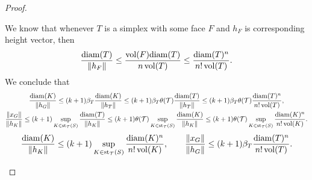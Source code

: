 \documentclass[10pt,letterpaper]{article}
\begin{document}
\begin{proof}
\begin{itemize}
        We know that whenever $T$ is a simplex with some face $F$ and $h_F$ is corresponding height vector, then 
        \begin{align*}
            \frac{{\operatorname{diam}}(T)}{ \|h_{F}\|}
            \leq  
            \frac{ \operatorname{vol}(F) {\operatorname{diam}}(T) }{ n \operatorname{vol}(T) }
            \leq 
            \frac{ {\operatorname{diam}}(T)^{n} }{ n! \operatorname{vol}(T) }
            .
        \end{align*}
        We conclude that 
        \begin{gather*}
            \frac{ {\operatorname{diam}}(K) }{ \| h_{{G}} \| }
            \leq 
            (k+1)\beta_T
            \frac{ {\operatorname{diam}}(K) }{ \| h_{T} \| }
            \leq 
            (k+1)\beta_T
            \theta({\mathcal T})
            \frac{ {\operatorname{diam}}(T) }{ \| h_{T} \| }
            \leq 
            (k+1)\beta_T
            \theta({\mathcal T})
            \frac{ {\operatorname{diam}}(T)^{n} }{ n! \operatorname{vol}(T) }
            ,
            \\
            \frac{ \| x_{G} \| }{ \| h_{K} \| }
            \leq 
            (k+1)
            \sup_{ K \in \operatorname{st}_{{\mathcal T}}(S) }
            \frac{ {\operatorname{diam}}(T) }{ \| h_{K} \| }
            \leq 
            (k+1)
            \theta({\mathcal T})
            \sup_{ K \in \operatorname{st}_{{\mathcal T}}(S) }
            \frac{ {\operatorname{diam}}(K) }{ \| h_{K} \| }
            \leq 
            (k+1)
            \theta({\mathcal T})
            \sup_{ K \in \operatorname{st}_{{\mathcal T}}(S) }
            \frac{ {\operatorname{diam}}(K)^{n} }{ n! \operatorname{vol}(K) }
            .
        \end{gather*}
        \begin{gather*}
            \frac{ {\operatorname{diam}}(K) }{ \| h_{{K}} \| }
            \leq 
            (k+1)
            \sup_{ K \in \operatorname{st}_{{\mathcal T}}(S) }
            \frac{ {\operatorname{diam}}(K)^{n} }{ n! \operatorname{vol}(K) }
            ,
            \qquad 
            \frac{ \| x_{G} \| }{ \| h_{G} \| }
            \leq 
            (k+1)\beta_T
            \frac{ {\operatorname{diam}}(T)^{n} }{ n! \operatorname{vol}(T) }
            .
        \end{gather*}

        
        

\end{itemize}
\end{proof}
\end{document}
